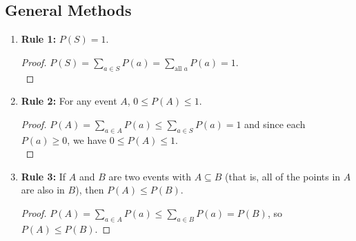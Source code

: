 \subsection{General Methods}

\begin{theorem}
    \phantom{}
    \begin{enumerate}
        \item \textbf{Rule 1:} $P(S) = 1.$
        \begin{proof}
            $\displaystyle P(S) = \sum_{a \in S} P(a) = \sum_{\text{all $a$}} P(a) = 1.$ \\
        \end{proof}
        \item \textbf{Rule 2:} For any event $A$, $0 \leq P(A) \leq 1.$
        \begin{proof}
            $\displaystyle P(A) = \sum_{a \in A} P(a) \leq \sum_{a \in S} P(a) = 1$
            and since each $P(a) \geq 0$, we have $0 \leq P(A) \leq 1.$ \\
        \end{proof}
        \item \textbf{Rule 3:} If $A$ and $B$ are two events with $A \subseteq B$
        (that is, all of the points in $A$ are also in $B$), then $P(A) \leq P(B).$
        \begin{proof}
            $\displaystyle P(A) = \sum_{a \in A} P(a) \leq \sum_{a \in B} P(a) = P(B)$,
            so $P(A) \leq P(B).$
        \end{proof}
    \end{enumerate}
\end{theorem}

